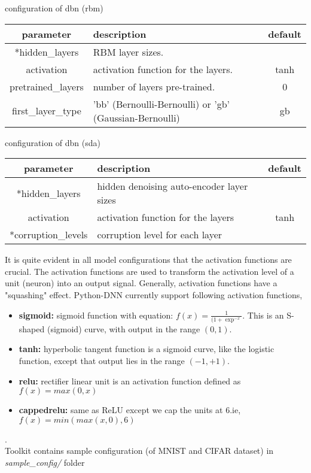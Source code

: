 \begin{table}[!htbp] 
 \begin{center}
  	\medskip  \small configuration of dbn (rbm)
	\begin{tabular}{|c|p{8cm}|c|} \hline
   	\textbf{parameter} & \textbf{description} & \textbf{default}\\  \hline
	*hidden\_layers &  RBM layer sizes. & \\ \hline
	activation & activation function for the layers. & tanh \\ \hline
	pretrained\_layers & number of layers  pre-trained. & 0 \\ \hline
	first\_layer\_type & 'bb' (Bernoulli-Bernoulli) or 'gb' (Gaussian-Bernoulli) & gb  \\ 	\hline 
	\end{tabular}		
\end{center}
\end{table} 
\begin{table}[!htbp] 
 \begin{center}
  	\medskip  \small configuration of dbn (sda)
	\begin{tabular}{|c|p{8cm}|c|} \hline
   	\textbf{parameter} & \textbf{description} & \textbf{default}\\  \hline
	*hidden\_layers &  hidden denoising auto-encoder layer sizes & \\ \hline
	activation & activation function for the layers & tanh \\ \hline
	*corruption\_levels & corruption level for each layer &  \\ \hline
	\end{tabular}		
\end{center} 
\end{table} 
\noindent It is quite evident in all model configurations that the activation functions are crucial. The activation functions are used to transform the activation level of a unit (neuron) into an output signal. Generally, activation functions have a "squashing" effect. Python-DNN currently support following activation functions,
\begin{itemize}
\item {\textbf{sigmoid:} sigmoid function with equation: $f(x) = \frac{1}{(1 + \exp^{-x}}$. This is an S-shaped (sigmoid) curve, with output in the range $(0,1)$.}
\item {\textbf{tanh:} hyperbolic tangent function is a sigmoid curve, like the logistic function, except that output lies in the range $(-1,+1)$.} 
\item {\textbf{relu:} rectifier linear unit is an activation function defined as $f(x) = max(0, x)$}
\item {\textbf{cappedrelu:} same as ReLU except we cap the units at 6.ie, $f(x) = min(max(x,0),6)$}
\end{itemize}
.\\
Toolkit contains sample configuration (of MNIST and CIFAR dataset) in \textit{sample\_config/} folder
\clearpage

